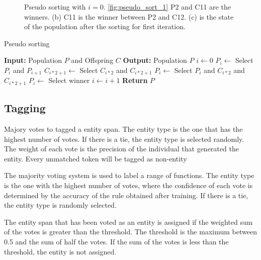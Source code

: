 \begin{figure}[ht]
  \centering
  \subfloat[Stage 1]{
    
    \label{fig:pseudo_sort_1}
  }
  \subfloat[Stage 2]{
    
    \label{fig:pseudo_sort_2}
  }
  \subfloat[Stage 3]{
    
    \label{fig:pseudo_sort_3}
  }
  \caption{Pseudo sorting with $i=0$. \ref{fig:pseudo_sort_1} P2 and C11 are the winners. (b) C11 is the winner between P2 and C12. (c) is the state of the population after the sorting for first iteration.}
  \label{fig:pseudo_sort}
\end{figure}



\begin{algorithm}[H]
  \caption{Pseudo sorting}
  \label{alg:pseudo_sort}
  \begin{algorithmic}[1]
    \State \textbf{Input:} Population $P$ and Offspring $C$
    \State \textbf{Output:} Population $P$
    \State $i \gets 0$
    \State $P_i \gets$ Select $P_i$ and $P_{i+1}$
    \State $C_{i*2+1} \gets$ Select $C_{i*2}$ and $C_{i*2+1}$
    \State $P_i \gets$ Select $P_i$ and $C_{i*2}$ and $C_{i*2+1}$
    \State $P_i \gets$ Select winner
    \State $i \gets i + 1$
    \EndWhile
    \State \textbf{Return} $P$
  \end{algorithmic}
\end{algorithm}


\subsection{Tagging}


Majory votes to tagged a entity span. The entity type is the one that has the highest number of votes. If there is a tie, the entity type is selected randomly. The weight of each vote is the precision of the individual that generated the entity. Every  unmatched  token  will  be  tagged  as  non-entity

The majority voting system is used to label a range of functions. The entity type is the one with the highest number of votes, where the confidence of each vote is determined by the accuracy of the rule obtained after training. If there is a tie, the entity type is randomly selected.

The entity span that has been voted as an entity is assigned if the weighted sum of the votes is greater than the threshold. The threshold is the maximum between 0.5 and the sum of half the votes. If the sum of the votes is less than the threshold, the entity is not assigned.

